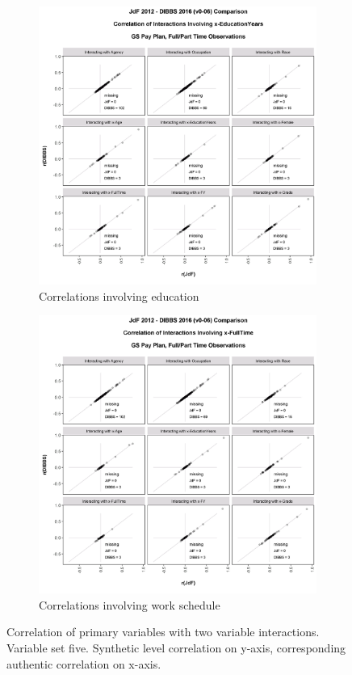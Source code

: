 \documentclass[10pt, letterpaper]{article}
\begin{document}
\begin{spacing}{1.0}
\clearpage

\begin{figure}[h]
    \centering
    \begin{subfigure}{1\textwidth}
        \centering
        \includegraphics[width=4.5in, trim={0 0.2in 0 1in}, clip]{JdFDIBBSCorrelationInteraction-x-EducationYears.png}
        \caption{Correlations involving education}
        \vspace{12pt}
    \end{subfigure}
    \begin{subfigure}{1\textwidth}
        \centering
        \includegraphics[width=4.5in, trim={0 0.2in 0 1in}, clip]{JdFDIBBSCorrelationInteraction-x-FullTime.png}
        \caption{Correlations involving work schedule}
        \vspace{12pt}
    \end{subfigure}
    \caption{Correlation of primary variables with two variable interactions.  Variable set five.  Synthetic level correlation on y-axis, corresponding authentic correlation on x-axis.}
    \label{figure:JdFDIBBSCorrelationInteraction5}
\end{figure}  


\end{spacing}
\end{document}
